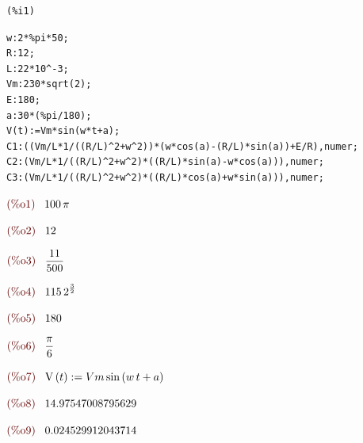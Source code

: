 \documentclass{article}
\begin{document}
\noindent
\begin{minipage}[t]{8ex}{\color{red}\bf
\begin{verbatim}
(%i1) 
\end{verbatim}}
\end{minipage}
\begin{minipage}[t]{\textwidth}{\color{blue}
\begin{verbatim}
w:2*%pi*50;
R:12;
L:22*10^-3;
Vm:230*sqrt(2);
E:180;
a:30*(%pi/180);
V(t):=Vm*sin(w*t+a);
C1:((Vm/L*1/((R/L)^2+w^2))*(w*cos(a)-(R/L)*sin(a))+E/R),numer;
C2:(Vm/L*1/((R/L)^2+w^2)*((R/L)*sin(a)-w*cos(a))),numer;
C3:(Vm/L*1/((R/L)^2+w^2)*((R/L)*cos(a)+w*sin(a))),numer;
\end{verbatim}}
\end{minipage}
\begin{math}\displaystyle
\parbox{8ex}{\color{labelcolor}(\%o1) }
100\,\pi 
\end{math}

\begin{math}\displaystyle
\parbox{8ex}{\color{labelcolor}(\%o2) }
12
\end{math}

\begin{math}\displaystyle
\parbox{8ex}{\color{labelcolor}(\%o3) }
\frac{11}{500}
\end{math}

\begin{math}\displaystyle
\parbox{8ex}{\color{labelcolor}(\%o4) }
115\,{2}^{\frac{3}{2}}
\end{math}

\begin{math}\displaystyle
\parbox{8ex}{\color{labelcolor}(\%o5) }
180
\end{math}

\begin{math}\displaystyle
\parbox{8ex}{\color{labelcolor}(\%o6) }
\frac{\pi }{6}
\end{math}

\begin{math}\displaystyle
\parbox{8ex}{\color{labelcolor}(\%o7) }
\mathrm{V}\left( t\right) :=Vm\,\mathrm{sin}\left( w\,t+a\right) 
\end{math}

\begin{math}\displaystyle
\parbox{8ex}{\color{labelcolor}(\%o8) }
14.97547008795629
\end{math}

\begin{math}\displaystyle
\parbox{8ex}{\color{labelcolor}(\%o9) }
0.024529912043714
\end{math}
\end{document}
